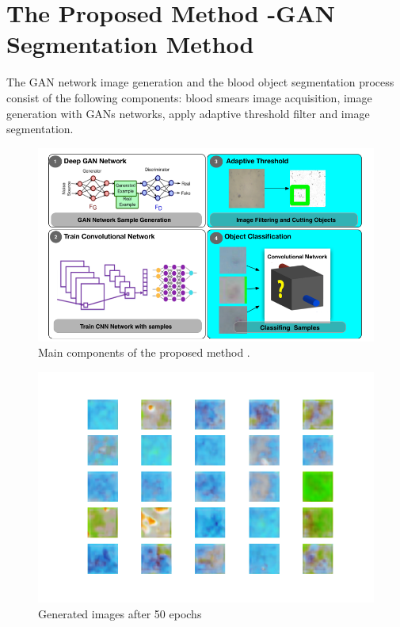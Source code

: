\section{The Proposed Method -GAN Segmentation Method}
\label{segmethod}


The GAN network image generation and the blood object segmentation process consist of the following components: blood smears image acquisition, image generation with GANs networks,  apply adaptive threshold filter and image segmentation.



\begin{figure}[h]
  \includegraphics[width=\textwidth]{images/MainComponents.png}
  \caption{Main components of the proposed method .}
\end{figure}



\begin{figure}[h]
\label{fig:gen50}
\begin{center}
\includegraphics[scale=0.45]{./images/generation/alta_mnist_50.png} \end{center}
\caption{Generated images after 50 epochs}
\end{figure}

